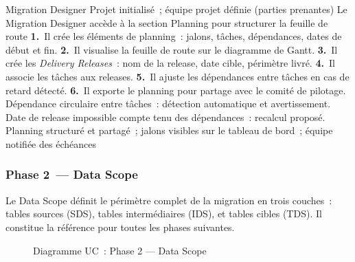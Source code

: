   {Migration Designer}
  {Projet initialisé~; équipe projet définie (parties prenantes)}
  {Le Migration Designer accède à la section Planning pour structurer la feuille de route}
  {\textbf{1.}~Il crée les éléments de planning~: jalons, tâches, dépendances, dates de début et fin.\newline
   \textbf{2.}~Il visualise la feuille de route sur le diagramme de Gantt.\newline
   \textbf{3.}~Il crée les \textit{Delivery Releases}~: nom de la release, date cible, périmètre livré.\newline
   \textbf{4.}~Il associe les tâches aux releases.\newline
   \textbf{5.}~Il ajuste les dépendances entre tâches en cas de retard détecté.\newline
   \textbf{6.}~Il exporte le planning pour partage avec le comité de pilotage.}
  {Dépendance circulaire entre tâches~: détection automatique et avertissement. Date de release impossible compte tenu des dépendances~: recalcul proposé.}
  {Planning structuré et partagé~; jalons visibles sur le tableau de bord~; équipe notifiée des échéances}
\fi %

\iffalse %
\subsubsection*{Phase 2~--- Data Scope}
\label{subsubsec:uc-phase2}

Le Data Scope définit le périmètre complet de la migration en trois couches~: tables sources (SDS), tables intermédiaires (IDS), et tables cibles (TDS). Il constitue la référence pour toutes les phases suivantes.

\begin{figure}[H]
\centering
{}
\caption{Diagramme UC~: Phase 2 — Data Scope}
\label{fig:uc-phase2}
\end{figure}

